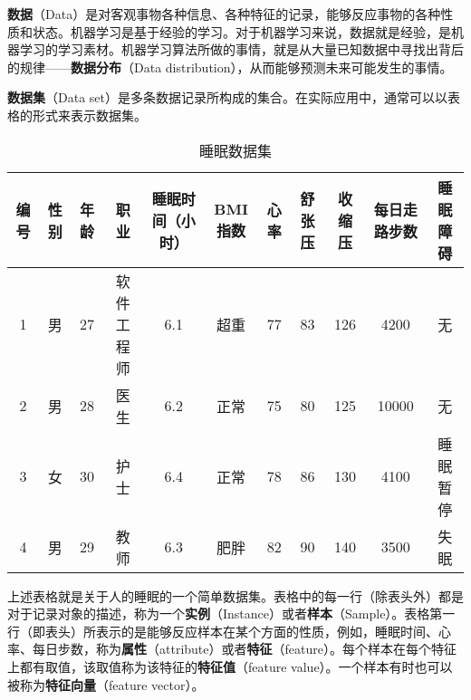 
\textbf{数据}（Data）是对客观事物各种信息、各种特征的记录，能够反应事物的各种性质和状态。机器学习是基于经验的学习。对于机器学习来说，数据就是经验，是机器学习的学习素材。机器学习算法所做的事情，就是从大量已知数据中寻找出背后的规律——\textbf{数据分布}（Data distribution），从而能够预测未来可能发生的事情。

\textbf{数据集}（Data set）是多条数据记录所构成的集合。在实际应用中，通常可以以表格的形式来表示数据集。

\begin{table}[ht]
\centering
\caption{睡眠数据集}\label{tab_datast2}
\begin{tabular}{|c|c|c|c|c|c|c|c|c|c|c|}
\hline
编号 & 性别 & 年龄 & 职业 & 睡眠时间（小时） & BMI指数 & 心率 & 舒张压 & 收缩压 & 每日走路步数 & 睡眠障碍 \\\hline
1 & 男 & 27 & 软件工程师 & 6.1 & 超重 & 77 & 83 & 126 & 4200 & 无 \\
\hline
2 & 男 & 28 & 医生 & 6.2 & 正常 & 75 & 80 & 125 & 10000 & 无 \\
\hline
3 & 女 & 30 & 护士 & 6.4 & 正常 & 78 & 86 & 130 & 4100 & 睡眠暂停 \\
\hline
4 & 男 & 29 & 教师 & 6.3 & 肥胖 & 82 & 90 & 140 & 3500 & 失眠 \\
\hline
\end{tabular}
\end{table}

上述表格就是关于人的睡眠的一个简单数据集。表格中的每一行（除表头外）都是对于记录对象的描述，称为一个\textbf{实例}（Instance）或者\textbf{样本}（Sample）。表格第一行（即表头）所表示的是能够反应样本在某个方面的性质，例如，睡眠时间、心率、每日步数，称为\textbf{属性}（attribute）或者\textbf{特征}（feature）。每个样本在每个特征上都有取值，该取值称为该特征的\textbf{特征值}（feature value）。一个样本有时也可以被称为\textbf{特征向量}（feature vector）。
